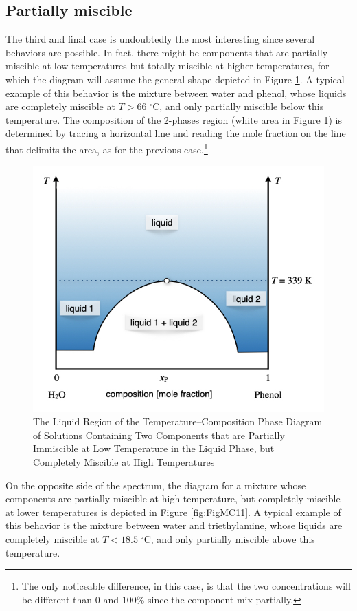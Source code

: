 \documentclass[
  9pt,
]{extbook}
\theoremstyle{definition}
\theoremstyle{definition}
\theoremstyle{definition}
\theoremstyle{remark}
\begin{document}
\hypertarget{partially-miscible}{%
\subsection{Partially miscible}\label{partially-miscible}}

The third and final case is undoubtedly the most interesting since several behaviors are possible. In fact, there might be components that are partially miscible at low temperatures but totally miscible at higher temperatures, for which the diagram will assume the general shape depicted in Figure \ref{fig:FigMC10}. A typical example of this behavior is the mixture between water and phenol, whose liquids are completely miscible at \(T>66\;^\circ \text{C}\), and only partially miscible below this temperature. The composition of the 2-phases region (white area in Figure \ref{fig:FigMC10}) is determined by tracing a horizontal line and reading the mole fraction on the line that delimits the area, as for the previous case.\footnote{The only noticeable difference, in this case, is that the two concentrations will be different than 0 and 100\% since the component mix partially.}

\begin{figure}

{\centering \includegraphics[width=0.6\linewidth]{./img/OEP_Figures.028} 

}

\caption{The Liquid Region of the Temperature–Composition Phase Diagram of Solutions Containing Two Components that are Partially Immiscible at Low Temperature in the Liquid Phase, but Completely Miscible at High Temperatures}\label{fig:FigMC10}
\end{figure}

On the opposite side of the spectrum, the diagram for a mixture whose components are partially miscible at high temperature, but completely miscible at lower temperatures is depicted in Figure \ref{fig:FigMC11}. A typical example of this behavior is the mixture between water and triethylamine, whose liquids are completely miscible at \(T<18.5\;^\circ \text{C}\), and only partially miscible above this temperature.
\end{document}

